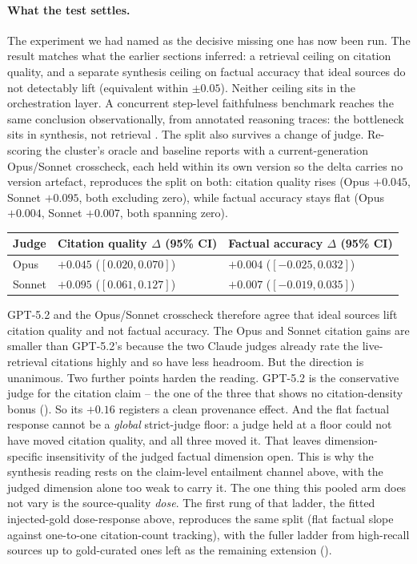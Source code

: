 \documentclass[11pt]{article}
\begin{document}
\paragraph{What the test settles.} The experiment we had named as the decisive missing one has
now been run. The result matches what the earlier sections inferred: a retrieval ceiling on
citation quality, and a separate synthesis ceiling on factual accuracy that ideal sources do
not detectably lift (equivalent within $\pm0.05$). Neither ceiling sits in the orchestration
layer. A concurrent step-level faithfulness benchmark reaches the same conclusion
observationally, from annotated reasoning traces: the bottleneck sits in synthesis, not
retrieval \citep{grace2026}. The split also survives a change of judge. Re-scoring the cluster's
oracle and baseline reports with a current-generation Opus/Sonnet crosscheck, each held
within its own version so the delta carries no version artefact, reproduces the split on
both: citation quality rises (Opus $+0.045$, Sonnet $+0.095$, both excluding zero), while
factual accuracy stays flat (Opus $+0.004$, Sonnet $+0.007$, both spanning zero).
\begin{center}
\begin{tabular}{lll}
\toprule
Judge & Citation quality $\Delta$ (95\% CI) & Factual accuracy $\Delta$ (95\% CI) \\
\midrule
Opus & $+0.045$ ($[0.020, 0.070]$) & $+0.004$ ($[-0.025, 0.032]$) \\
Sonnet & $+0.095$ ($[0.061, 0.127]$) & $+0.007$ ($[-0.019, 0.035]$) \\
\bottomrule
\end{tabular}
\end{center}
GPT-5.2 and the Opus/Sonnet crosscheck therefore agree that ideal sources lift citation
quality and not factual accuracy. The Opus and Sonnet citation gains are smaller than GPT-5.2's because the two
Claude judges already rate the live-retrieval citations highly and so have less headroom. But
the direction is unanimous. Two further points harden the reading. GPT-5.2 is the conservative
judge for the citation claim -- the one of the three that shows no citation-density bonus
(). So its $+0.16$ registers a clean provenance effect. And the flat
factual response cannot be a \emph{global} strict-judge floor: a judge held
at a floor could not have moved citation quality, and all three moved it. That leaves
dimension-specific insensitivity of the judged factual dimension open. This
is why the synthesis reading rests on the claim-level entailment channel above, with the
judged dimension alone too weak to carry it. The one thing this pooled arm does
not vary is the source-quality \emph{dose}. The first rung of that ladder, the fitted
injected-gold dose-response above, reproduces the same split (flat factual slope against
one-to-one citation-count tracking), with the fuller ladder from high-recall sources up to
gold-curated ones left as the remaining extension ().
\end{document}
